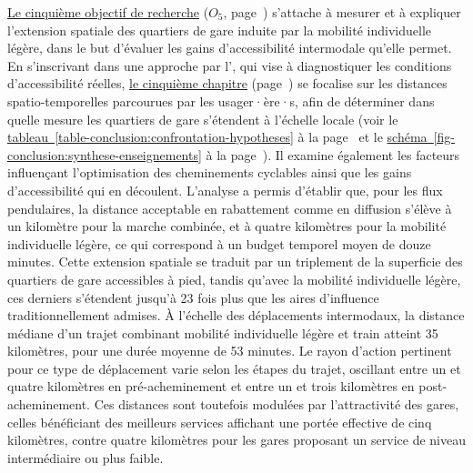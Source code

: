 \begin{refsegment}
\hyperref[objectif-5]{Le cinquième objectif de recherche} (\(O_5\), page~\pageref{objectif-5}) s’attache à mesurer et à expliquer l’extension spatiale des quartiers de gare induite par la mobilité individuelle légère, dans le but d’évaluer les gains d’accessibilité intermodale qu’elle permet. En s’inscrivant dans une approche par l', qui vise à diagnostiquer les conditions d’accessibilité réelles, \hyperref[chap5:titre]{le cinquième chapitre} (page~\pageref{chap5:titre}) se focalise sur les distances spatio-temporelles parcourues par les usager·ère·s, afin de déterminer dans quelle mesure les quartiers de gare s’étendent à l’échelle locale (voir le \hyperref[table-conclusion:confrontation-hypotheses]{tableau~\ref{table-conclusion:confrontation-hypotheses}} à la page~\pageref{table-conclusion:confrontation-hypotheses} et le \hyperref[fig-conclusion:synthese-enseignements]{schéma~\ref{fig-conclusion:synthese-enseignements}} à la page~\pageref{fig-conclusion:synthese-enseignements}). Il examine également les facteurs influençant l’optimisation des cheminements cyclables ainsi que les gains d’accessibilité qui en découlent. L’analyse a permis d’établir que, pour les flux pendulaires, la distance acceptable en \gls{rabattement} comme en \gls{diffusion} s’élève à un kilomètre pour la marche combinée, et à quatre kilomètres pour la mobilité individuelle légère, ce qui correspond à un budget temporel moyen de douze minutes. Cette extension spatiale se traduit par un triplement de la superficie des quartiers de gare accessibles à pied, tandis qu’avec la mobilité individuelle légère, ces derniers s’étendent jusqu’à 23 fois plus que les aires d’influence traditionnellement admises. À l’échelle des déplacements intermodaux, la distance médiane d’un trajet combinant mobilité individuelle légère et train atteint 35 kilomètres, pour une durée moyenne de 53 minutes. Le rayon d’action pertinent pour ce type de \gls{déplacement} varie selon les étapes du trajet, oscillant entre un et quatre kilomètres en pré-acheminement et entre un et trois kilomètres en post-acheminement. Ces distances sont toutefois modulées par l’attractivité des gares, celles bénéficiant des meilleurs services affichant une portée effective de cinq kilomètres, contre quatre kilomètres pour les gares proposant un service de niveau intermédiaire ou plus faible.%


\end{refsegment}
